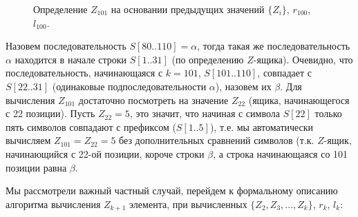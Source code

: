 \documentclass[letterpaper, 11pt]{article}
\begin{document}
\begin{figure}[H]
  \caption{Определение $Z_{101}$ на основании предыдущих значений $\{Z_i\}$, $r_{100}$, $l_{100}$.}
\end{figure}
\par
Назовем последовательность $S[80..110] = \alpha$, тогда такая же последовательность $\alpha$ находится в начале строки $S[1..31]$ (по определению $Z$-ящика). Очевидно, что последовательность, начинающаяся с $k = 101$, $S[101..110]$, совпадает с $S[22..31]$ (одинаковые подпоследовательности $\alpha$), назовем их $\beta$. Для вычисления $Z_{101}$ достаточно посмотреть на значение $Z_{22}$ (ящика, начинающегося с 22 позиции). Пусть $Z_{22} = 5$, это значит, что начиная с символа $S[22]$ только пять символов совпадают с префиксом ($S[1..5]$), т.е. мы автоматически вычисляем $Z_{101} = Z_{22} = 5$ без дополнительных сравнений символов (т.к. $Z$-ящик, начинающийся с 22-ой позиции, короче строки $\beta$, а строка начинающаяся со 101 позиции равна $\beta$.
\par
Мы рассмотрели важный частный случай, перейдем к формальному описанию алгоритма вычисления $Z_{k+1}$ элемента, при вычисленных $\{Z_2, Z_3, ..., Z_k\}$, $r_k$, $l_k$:
\end{document}
